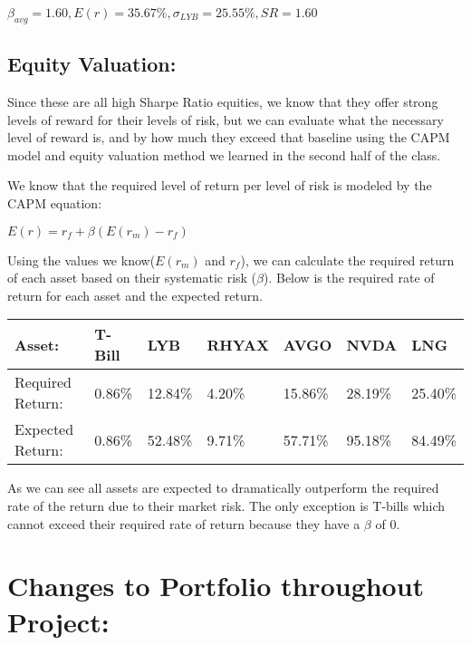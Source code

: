 \documentclass{article}
\begin{document}
\begin{center}
    \begin{math}
        \beta_{avg} = 1.60, E(r) = 35.67\%, \sigma_{LYB} = 25.55\%, SR = 1.60
    \end{math}
\end{center}

\subsection{Equity Valuation:}

Since these are all high Sharpe Ratio equities, we know that they offer strong levels of reward for their levels of risk, but we can evaluate what the necessary level of reward is, and by how much they exceed that baseline using the CAPM model and equity valuation method we learned in the second half of the class.

We know that the required level of return per level of risk is modeled by the CAPM equation:

\begin{center}
    \begin{math}
        E(r) = r_f + \beta(E(r_m) - r_f)
    \end{math}
\end{center}

Using the values we know($E(r_m)$ and $r_f$), we can calculate the required return of each asset based on their systematic risk ($\beta$). Below is the required rate of return for each asset and the expected return. 

\begin{table}[!ht]
    \centering
    \begin{tabular}{|l|l|l|l|l|l|l|}
    \hline
        Asset: & T-Bill & LYB & RHYAX & AVGO & NVDA & LNG \\ \hline
        Required Return: & 0.86\% & 12.84\% & 4.20\% & 15.86\% & 28.19\% & 25.40\% \\ \hline
        Expected Return: & 0.86\% & 52.48\% & 9.71\% & 57.71\% & 95.18\% & 84.49\% \\ \hline
    \end{tabular}
\end{table}

As we can see all assets are expected to dramatically outperform the required rate of the return due to their market risk. The only exception is T-bills which cannot exceed their required rate of return because they have a $\beta$ of 0.

\section{Changes to Portfolio throughout Project:}
\end{document}
